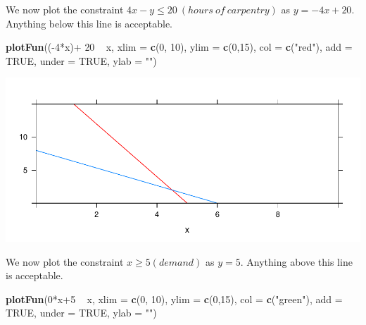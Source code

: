 \documentclass[]{article}
\newenvironment{Shaded}{\begin{snugshade}}{\end{snugshade}}
\newcommand{\KeywordTok}[1]{\textcolor[rgb]{0.13,0.29,0.53}{\textbf{{#1}}}}
\newcommand{\DataTypeTok}[1]{\textcolor[rgb]{0.13,0.29,0.53}{{#1}}}
\newcommand{\DecValTok}[1]{\textcolor[rgb]{0.00,0.00,0.81}{{#1}}}
\newcommand{\StringTok}[1]{\textcolor[rgb]{0.31,0.60,0.02}{{#1}}}
\newcommand{\OtherTok}[1]{\textcolor[rgb]{0.56,0.35,0.01}{{#1}}}
\newcommand{\NormalTok}[1]{{#1}}
\begin{document}
We now plot the constraint \(4x - y \leq 20 ~ (hours~of~carpentry)\) as
\(y = -4x + 20\). Anything below this line is acceptable.

\begin{Shaded}
\begin{Highlighting}[]
\KeywordTok{plotFun}\NormalTok{((-}\DecValTok{4}\NormalTok{*x)+}\StringTok{ }\DecValTok{20} \NormalTok{~}\StringTok{ }\NormalTok{x, }\DataTypeTok{xlim =} \KeywordTok{c}\NormalTok{(}\DecValTok{0}\NormalTok{, }\DecValTok{10}\NormalTok{), }\DataTypeTok{ylim =} \KeywordTok{c}\NormalTok{(}\DecValTok{0}\NormalTok{,}\DecValTok{15}\NormalTok{), }
        \DataTypeTok{col =} \KeywordTok{c}\NormalTok{(}\StringTok{"red"}\NormalTok{), }\DataTypeTok{add =} \OtherTok{TRUE}\NormalTok{, }\DataTypeTok{under =} \OtherTok{TRUE}\NormalTok{,  }\DataTypeTok{ylab =} \StringTok{""}\NormalTok{)}
\end{Highlighting}
\end{Shaded}

\includegraphics{Christophe_Hunt_hw6_files/figure-latex/unnamed-chunk-2-1.pdf}

We now plot the constraint \(x \geq 5 (demand)\) as \(y = 5\). Anything
above this line is acceptable.

\begin{Shaded}
\begin{Highlighting}[]
\KeywordTok{plotFun}\NormalTok{(}\DecValTok{0}\NormalTok{*x}\DecValTok{+5} \NormalTok{~}\StringTok{ }\NormalTok{x, }\DataTypeTok{xlim =} \KeywordTok{c}\NormalTok{(}\DecValTok{0}\NormalTok{, }\DecValTok{10}\NormalTok{), }\DataTypeTok{ylim =} \KeywordTok{c}\NormalTok{(}\DecValTok{0}\NormalTok{,}\DecValTok{15}\NormalTok{),}
        \DataTypeTok{col =} \KeywordTok{c}\NormalTok{(}\StringTok{"green"}\NormalTok{), }\DataTypeTok{add =} \OtherTok{TRUE}\NormalTok{, }\DataTypeTok{under =} \OtherTok{TRUE}\NormalTok{,  }\DataTypeTok{ylab =} \StringTok{""}\NormalTok{)}
\end{Highlighting}
\end{Shaded}
\end{document}
